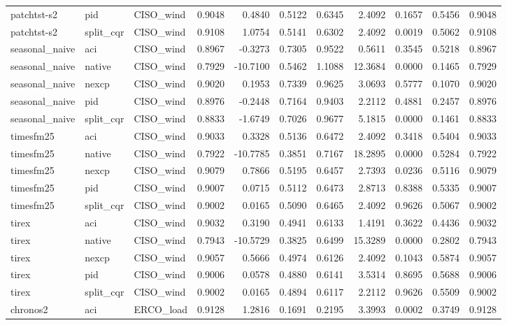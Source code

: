 \begin{tabular}{lllrrrrrrrr}
patchtst-s2 & pid & CISO_wind & 0.9048 & 0.4840 & 0.5122 & 0.6345 & 2.4092 & 0.1657 & 0.5456 & 0.9048 \\
patchtst-s2 & split_cqr & CISO_wind & 0.9108 & 1.0754 & 0.5141 & 0.6302 & 2.4092 & 0.0019 & 0.5062 & 0.9108 \\
seasonal_naive & aci & CISO_wind & 0.8967 & -0.3273 & 0.7305 & 0.9522 & 0.5611 & 0.3545 & 0.5218 & 0.8967 \\
seasonal_naive & native & CISO_wind & 0.7929 & -10.7100 & 0.5462 & 1.1088 & 12.3684 & 0.0000 & 0.1465 & 0.7929 \\
seasonal_naive & nexcp & CISO_wind & 0.9020 & 0.1953 & 0.7339 & 0.9625 & 3.0693 & 0.5777 & 0.1070 & 0.9020 \\
seasonal_naive & pid & CISO_wind & 0.8976 & -0.2448 & 0.7164 & 0.9403 & 2.2112 & 0.4881 & 0.2457 & 0.8976 \\
seasonal_naive & split_cqr & CISO_wind & 0.8833 & -1.6749 & 0.7026 & 0.9677 & 5.1815 & 0.0000 & 0.1461 & 0.8833 \\
timesfm25 & aci & CISO_wind & 0.9033 & 0.3328 & 0.5136 & 0.6472 & 2.4092 & 0.3418 & 0.5404 & 0.9033 \\
timesfm25 & native & CISO_wind & 0.7922 & -10.7785 & 0.3851 & 0.7167 & 18.2895 & 0.0000 & 0.5284 & 0.7922 \\
timesfm25 & nexcp & CISO_wind & 0.9079 & 0.7866 & 0.5195 & 0.6457 & 2.7393 & 0.0236 & 0.5116 & 0.9079 \\
timesfm25 & pid & CISO_wind & 0.9007 & 0.0715 & 0.5112 & 0.6473 & 2.8713 & 0.8388 & 0.5335 & 0.9007 \\
timesfm25 & split_cqr & CISO_wind & 0.9002 & 0.0165 & 0.5090 & 0.6465 & 2.4092 & 0.9626 & 0.5067 & 0.9002 \\
tirex & aci & CISO_wind & 0.9032 & 0.3190 & 0.4941 & 0.6133 & 1.4191 & 0.3622 & 0.4436 & 0.9032 \\
tirex & native & CISO_wind & 0.7943 & -10.5729 & 0.3825 & 0.6499 & 15.3289 & 0.0000 & 0.2802 & 0.7943 \\
tirex & nexcp & CISO_wind & 0.9057 & 0.5666 & 0.4974 & 0.6126 & 2.4092 & 0.1043 & 0.5874 & 0.9057 \\
tirex & pid & CISO_wind & 0.9006 & 0.0578 & 0.4880 & 0.6141 & 3.5314 & 0.8695 & 0.5688 & 0.9006 \\
tirex & split_cqr & CISO_wind & 0.9002 & 0.0165 & 0.4894 & 0.6117 & 2.2112 & 0.9626 & 0.5509 & 0.9002 \\
chronos2 & aci & ERCO_load & 0.9128 & 1.2816 & 0.1691 & 0.2195 & 3.3993 & 0.0002 & 0.3749 & 0.9128 \\

\end{tabular}
